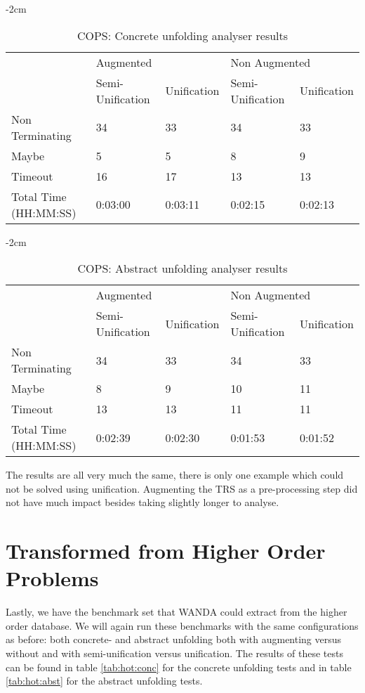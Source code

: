 \begin{table}[ht]
    \centering
    \addtolength{\leftskip} {-2cm}
    \addtolength{\rightskip}{-2cm}

    \begin{tabular}{|l|l|l|l|l|}
    \cline{2-5} 
    \multicolumn{1}{c|}{} & \multicolumn{2}{l|}{Augmented} & \multicolumn{2}{l|}{Non Augmented} \\ \cline{2-5} 
    \multicolumn{1}{c|}{} & Semi-Unification & Unification & Semi-Unification & Unification \\ \hline
    Non Terminating & 34 & 33 & 34 & 33 \\ \hline
    Maybe & 5 & 5 & 8 & 9\\ \hline
    Timeout & 16 & 17 & 13 & 13 \\ \hline
    Total Time (HH:MM:SS) & 0:03:00 & 0:03:11 & 0:02:15 & 0:02:13 \\ \hline
    \end{tabular}
    \caption{COPS: Concrete unfolding analyser results}
\label{tab:cops:conc}

\end{table}
\begin{table}[ht]
    \centering
    \addtolength{\leftskip} {-2cm}
    \addtolength{\rightskip}{-2cm}

    \begin{tabular}{|l|l|l|l|l|}
    \cline{2-5} 
    \multicolumn{1}{c|}{} & \multicolumn{2}{l|}{Augmented} & \multicolumn{2}{l|}{Non Augmented} \\ \cline{2-5} 
    \multicolumn{1}{c|}{} & Semi-Unification & Unification & Semi-Unification & Unification \\ \hline
    Non Terminating & 34 & 33 & 34 & 33 \\ \hline
    Maybe & 8 & 9 & 10 & 11 \\ \hline
    Timeout & 13 & 13 & 11 & 11 \\ \hline
    Total Time (HH:MM:SS) & 0:02:39 & 0:02:30 & 0:01:53 & 0:01:52 \\ \hline
    \end{tabular}
    \caption{COPS: Abstract unfolding analyser results}
    \label{tab:cops:abst}
\end{table}

The results are all very much the same, there is only one example which could not be solved using unification. Augmenting the TRS as a pre-processing step did not have much impact besides taking slightly longer to analyse. 

\section{Transformed from Higher Order Problems}
Lastly, we have the benchmark set that WANDA\cite{KOP:WANDASITE} could extract from the higher order database. We will again run these benchmarks with the same configurations as before: both concrete- and abstract unfolding both with augmenting versus without and with semi-unification versus unification. The results of these tests can be found in table \ref{tab:hot:conc} for the concrete unfolding tests and in table \ref{tab:hot:abst} for the abstract unfolding tests.  

